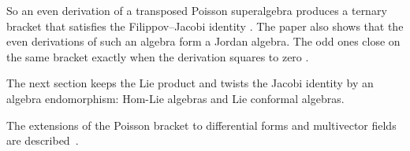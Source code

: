 So an even derivation of a transposed Poisson superalgebra produces a ternary
bracket that satisfies the Filippov--Jacobi identity
\cite[p.~495]{AbramovSovetnikov2025}. The paper also shows that the even
derivations of such an algebra form a Jordan algebra. The odd ones close on
the same bracket exactly when the derivation squares to zero \cite[Theorem~2,
p.~492]{AbramovSovetnikov2025}.

The next section keeps the Lie product and twists the Jacobi identity by an
algebra endomorphism: Hom-Lie algebras and Lie conformal algebras.

The extensions of the Poisson bracket to differential forms and multivector
fields are described~\cite{WlExtensionsOfThePoissonBracketT2020}.
